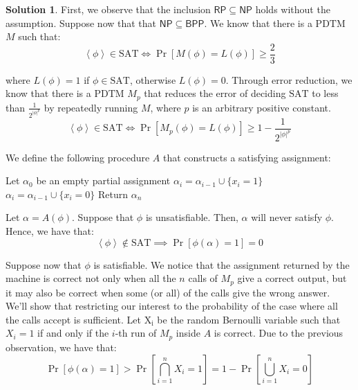 \documentclass[12pt,a4paper]{report}
\theoremstyle{definition}
\newtheorem{solution}{Solution}
\newcommand{\abs}[1]{\left|#1\right|}
\newcommand{\abk}[1]{\left\langle#1\right\rangle}
\begin{document}
    \begin{solution}
        First, we observe that the inclusion $\mathsf{RP} \subseteq \mathsf{NP}$ holds without the assumption. Suppose now that that $\mathsf{NP} \subseteq \mathsf{BPP}$. We know that there is a $\mathrm{PDTM}$ $M$ such that:
        \[\abk{\phi} \in \mathrm{SAT} \iff \Pr[M(\phi) = L(\phi)] \geq \frac{2}{3}\]

        where $L(\phi) = 1$ if $\phi \in \mathrm{SAT}$, otherwise $L(\phi) = 0$. Through error reduction, we know that there is a $\mathrm{PDTM}$ $M_p$ that reduces the error of deciding $\mathrm{SAT}$ to less than $\frac{1}{2^{{\abs{\phi}}^p}}$ by repeatedly running $M$, where $p$ is an arbitrary positive constant.
        \[\abk{\phi} \in \mathrm{SAT} \iff \Pr[M_p(\phi) = L(\phi)] \geq 1-\frac{1}{2^{{\abs{\phi}}^p}}\]
        
        We define the following procedure $A$ that constructs a satisfying assignment:

        \begin{algorithmic}[H]
                \State Let $\alpha_0$ be an empty partial assignment
                        \State $\alpha_i = \alpha_{i-1} \cup \{x_i = 1\}$
                    \Else
                        \State $\alpha_i = \alpha_{i-1} \cup \{x_i = 0\}$
                    \EndIf
                \EndFor
                \State Return $\alpha_n$
            \EndFunction
        \end{algorithmic}

        Let $\alpha = A(\phi)$. Suppose that $\phi$ is unsatisfiable. Then, $\alpha$ will never satisfy $\phi$. Hence, we have that:
        \[\abk{\phi} \notin \mathrm{SAT} \implies \Pr[\phi(\alpha) = 1] = 0\]

        Suppose now that $\phi$ is satisfiable. We notice that the assignment returned by the machine is correct not only when all the $n$ calls of $M_p$ give a correct output, but it may also be correct when some (or all) of the calls give the wrong answer. We'll show that restricting our interest to the probability of the case where all the calls accept is sufficient. Let $\mathrm{X_i}$ be the random Bernoulli variable such that $X_i = 1$ if and only if the $i$-th run of $M_p$ inside $A$ is correct. Due to the previous observation, we have that:
        \[\Pr[\phi(\alpha) = 1] > \Pr \left [\bigcap_{i = 1}^n X_i = 1 \right ] = 1 - \Pr \left [\bigcup_{i = 1}^n X_i = 0 \right ]\]


\end{solution}
\end{document}
